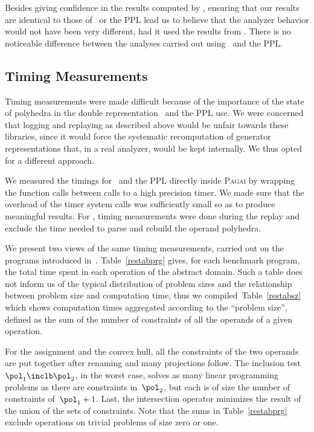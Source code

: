 Besides giving confidence in the results computed by \libpoly ,
ensuring that our results are identical to those of \newpolka\ or the PPL
lead us to believe that the analyzer behavior would not have been very different,
had it used the results from \libpoly .
There is no noticeable difference between the analyses carried out using \newpolka\ and the PPL.
\subsection{Timing Measurements}
Timing measurements were made difficult because of
the importance of the state of polyhedra in the double representation \newpolka\ and the PPL use.
We were concerned that logging and replaying as described above would be unfair towards these libraries, since it would force the systematic recomputation of generator representations that, in a real analyzer, would be kept internally. We thus opted for a different approach.

We measured the timings for \newpolka\ and the PPL directly inside \textsc{Pagai} by wrapping the function calls between calls to a high precision timer.
We made sure that the overhead of the timer system calls was sufficiently small so as to produce meaningful results.
For \libpoly, timing measurements were done during the replay and
exclude the time needed to parse and rebuild the operand polyhedra.

We present two views of the same timing measurements,
carried out on the programs introduced in~.
Table~\ref{restabprg} gives, for each benchmark program, the total time spent in each operation of the abstract domain.
Such a table does not inform us of the typical distribution of problem sizes and the relationship between problem size and computation time, thus we compiled~Table~\ref{restabsz} which
shows computation times aggregated according to the ``problem size'', defined as the sum of the number of constraints of all the operands of a given operation.

For the assignment and the convex hull,
all the constraints of the two operands are put together after renaming
and many projections follow.
The inclusion test~$\pol_1\inclb\pol_2$, in the worst case,
solves as many linear programming problems as there are constraints in~$\pol_2$,
but each is of size the number of constraints of~$\pol_1+1$.
Last, the intersection operator minimizes the result of the union of the sets of constraints.
Note that the sums in Table~\ref{restabprg} exclude operations on trivial problems of size zero or one.

